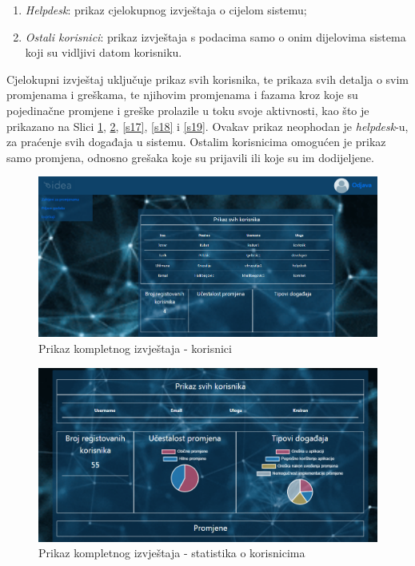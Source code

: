 \documentclass[12pt,a4paper]{article}
\begin{document}
\begin{enumerate}
\item \textit{Helpdesk}: prikaz cjelokupnog izvještaja o cijelom sistemu;
\item \textit{Ostali korisnici}: prikaz izvještaja s podacima samo o onim dijelovima sistema koji su vidljivi datom korisniku.
\end{enumerate}

Cjelokupni izvještaj uključuje prikaz svih korisnika, te prikaza svih detalja o svim promjenama i greškama, te njihovim promjenama i fazama kroz koje su pojedinačne promjene i greške prolazile u toku svoje aktivnosti, kao što je prikazano na Slici \ref{s15}, \ref{s16}, \ref{s17}, \ref{s18} i \ref{s19}. Ovakav prikaz neophodan je \textit{helpdesk}-u, za praćenje svih događaja u sistemu. Ostalim korisnicima omogućen je prikaz samo promjena, odnosno grešaka koje su prijavili ili koje su im dodijeljene.

\begin{figure}[H]
\center
\includegraphics[scale=0.35]{../res/UI/report1.PNG}
\caption{Prikaz kompletnog izvještaja - korisnici}
\label{s15}
\end{figure}

\begin{figure}[H]
\center
\includegraphics[scale=0.4]{../res/UI/report1-1.PNG}
\caption{Prikaz kompletnog izvještaja - statistika o korisnicima}
\label{s16}
\end{figure}
\end{document}
